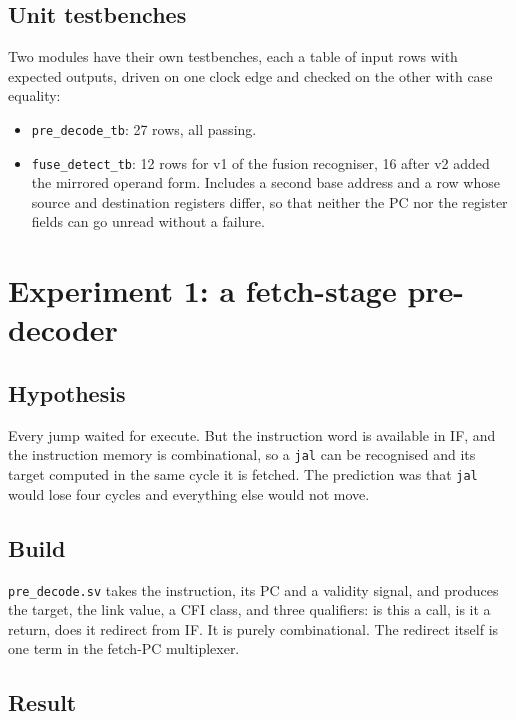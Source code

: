 \documentclass[11pt]{article}
\begin{document}
\subsection{Unit testbenches}

Two modules have their own testbenches, each a table of input rows with expected outputs, driven
on one clock edge and checked on the other with case equality:

\begin{itemize}
\item \texttt{pre\_decode\_tb}: 27 rows, all passing.
\item \texttt{fuse\_detect\_tb}: 12 rows for v1 of the fusion recogniser, 16 after v2 added the
  mirrored operand form. Includes a second base address and a row whose source and destination
  registers differ, so that neither the PC nor the register fields can go unread without a
  failure.
\end{itemize}

\section{Experiment 1: a fetch-stage pre-decoder}

\subsection{Hypothesis}

Every jump waited for execute. But the instruction word is available in IF, and the instruction
memory is combinational, so a \texttt{jal} can be recognised and its target computed in the same
cycle it is fetched. The prediction was that \texttt{jal} would lose four cycles and everything
else would not move.

\subsection{Build}

\texttt{pre\_decode.sv} takes the instruction, its PC and a validity signal, and produces the
target, the link value, a CFI class, and three qualifiers: is this a call, is it a return, does
it redirect from IF. It is purely combinational. The redirect itself is one term in the
fetch-PC multiplexer.

\subsection{Result}
\end{document}
